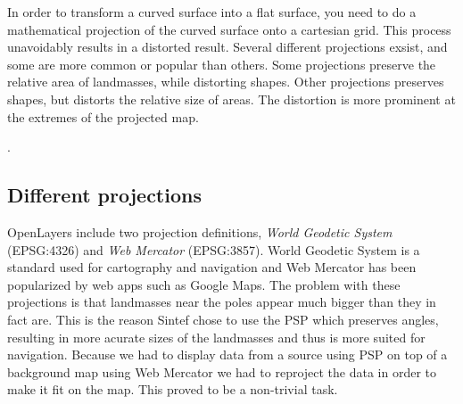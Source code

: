 \documentclass[11pt,a4paper,titlepage,oneside]{report}
\begin{document}
In order to transform a curved surface into a flat surface, you need to do a mathematical projection of the curved surface onto a cartesian grid.
This process unavoidably results in a distorted result. Several different projections exsist, and some are more common or popular than others.
Some projections preserve the relative area of landmasses, while distorting shapes. Other projections preserves shapes, but distorts the relative size of areas. The distortion is more prominent at the extremes of the projected map.

\cite{mapProjections}.

\subsection{Different projections}
OpenLayers include two projection definitions, \textit{World Geodetic System} (EPSG:4326) and \textit{Web Mercator} (EPSG:3857). World Geodetic System is a standard used for cartography and navigation and Web Mercator has been popularized by web apps such as Google Maps. The problem with these projections is that landmasses near the poles appear much bigger than they in fact are.
This is the reason Sintef chose to use the \gls{PSP} which preserves angles, resulting in more acurate sizes of the landmasses and thus is more suited for navigation.
Because we had to display data from a source using \gls{PSP} on top of a background map using Web Mercator we had to reproject the data in order to make it fit on the map. This proved to be a non-trivial task. 
\end{document}
